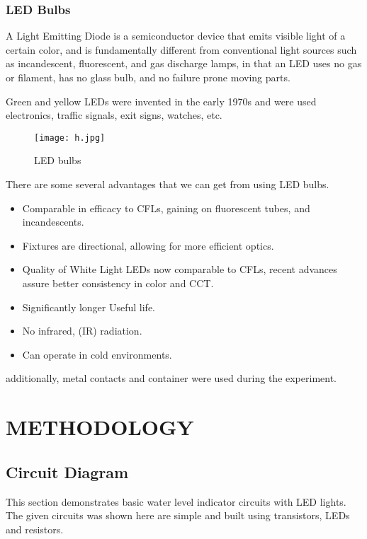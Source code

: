 \documentclass[12pt,a4paper,oneside]{book}
\theoremstyle{plain}
\numberwithin{equation}{chapter} \DeclareMathOperator{\Var}{Var}
\begin{document}
\newpage

\subsection{LED Bulbs}

A Light Emitting Diode is a semiconductor device that emits visible light of a certain color, and is fundamentally different from conventional light sources such as incandescent, fluorescent, and gas discharge lamps, in that an LED uses no gas or filament, has no glass bulb, and no failure prone moving parts.

Green and yellow LEDs were invented in the early 1970s and were used electronics, traffic signals, exit signs, watches, etc.

\begin{figure}[hbt!]
    \centering
    \texttt{[image: h.jpg]}
    \caption{LED bulbs}
    \label{fig:h}
\end{figure}

There are some several advantages that we can get from using LED bulbs.

\begin{itemize}
\item  Comparable in efficacy to CFLs, gaining on fluorescent tubes, and incandescents.
\item  Fixtures are directional, allowing for more efficient
optics.
\item  Quality of White Light LEDs now comparable to CFLs,
recent advances assure better consistency in color and CCT.
\item  Significantly longer Useful life.
\item  No infrared, (IR) radiation.
\item  Can operate in cold environments.

\end{itemize}

additionally, metal contacts and container were used during the experiment. 

\chapter{METHODOLOGY}
\section{Circuit Diagram}

This section demonstrates basic water level indicator circuits with LED lights. The given circuits was shown  here  are simple and built using transistors, LEDs and  resistors. 
\end{document}

